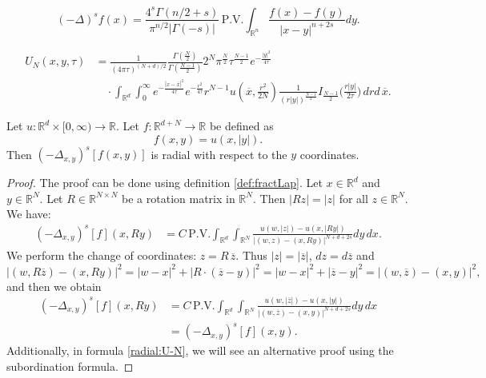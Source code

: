 \documentclass[10pt,a4paper]{amsart}
\newcommand\R{\mathbb{R}}
\begin{document}
\begin{equation}\label{def:fractLap}
(-\Delta)^s f(x)=  \frac{4^s \Gamma(n/2+s)}{\pi^{n/2} |\Gamma(-s)|}\,  \text{P.V.} \int_{\R^n} \frac{f(x)-f(y)}{|x-y|^{n+2s}}dy.
\end{equation}

\begin{align}\label{radial:U-N}
  U_N(x,y,\tau) & = \frac{1}{(4 \pi \tau)^{(N+d)/2}}
  \frac{\Gamma(\frac{N}{2} )}{\Gamma(\frac{N-1}{2})}   2^N \pi^{\frac{N}{2} }
    \tau^{\frac{N-1}{2}}  e^{ - \frac{ |y|^2 }{4 \tau} }  \\ \nonumber
  &\quad \cdot \int_{\R^d}  \int_0^\infty
   e^{ - \frac{|x-\overline{x}|^2 }{4 \tau} } e^{ - \frac{  r^2}{4 \tau} }  r^{N-1 }u(\overline{x}, \frac{r^2}{2N} ) \frac{ 1 }{(r  |y|   ) ^{\frac{N-1}{2}}}  I_{\frac{N-1}{2}}\Big( \frac{r  |y|  }{2 \tau} \Big) \,d r d \, \overline{x}.
\end{align}

\begin{lemma} \label{Lemma:radial}
Let $u:\mathbb{R}^{d} \times [0,\infty) \to  \mathbb{R}$. Let $f:  \mathbb{R}^{d+N} \to  \mathbb{R}$ be defined as
$$f(x,y)=u(x,|y|).$$
Then $(-\Delta_{x,y})^s [f(x,y)]$ is radial with respect to the $y$ coordinates.
\end{lemma}

\begin{proof}
The proof can be done using definition \eqref{def:fractLap}.
Let $x\in\mathbb{R}^{d}$ and $  y\in \mathbb{R}^{N}$. Let $R \in \mathbb{R}^{N\times N}$ be a rotation matrix in $\mathbb{R}^{N}$. Then $|Rz|=|z|$ for all $z\in \mathbb{R}^{N}$.
We have:
\begin{align*}
(-\Delta_{x,y} )^s [f](x,Ry)&= C \,  \text{P.V.} \int_{\R^d}\int_{\R^N} \frac{u(w,|z|)-u(x,|Ry|)}{ |(w,z)-(x,Ry)|^{N+d+2s} }dy \, dx.
\end{align*}
We perform the change of coordinates: $z=R\, \overline{z}$. Thus $|z|=|\overline{z}|$,   $dz= d\overline{z}$ and
$$ |(w,R\overline{z})-(x,Ry)|^2 = |w-x|^2 +  |R\cdot (\overline{z}-  y)|^2 = |w-x|^2 +  |\overline{z}-  y|^2 = |(w,\overline{z})-(x,y)|^2 ,$$
and then we obtain
\begin{align*}
(-\Delta_{x,y} )^s [f](x,Ry)&=  C   \,  \text{P.V.} \int_{\R^d}\int_{\R^N} \frac{u(w,|\overline{z}|)-u(x,|y|)}{|(w,\overline{z})-(x,y)|^{N+d+2s}}dy \, dx \\
&=(-\Delta_{x,y} )^s [f](x,y).
\end{align*}
Additionally, in formula \eqref{radial:U-N}, we will see an alternative proof using the subordination formula.
\end{proof}
\end{document}
